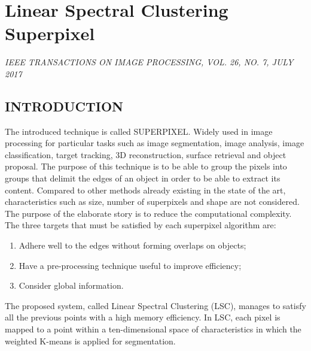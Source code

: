 \section{Linear Spectral Clustering Superpixel}

\begin{flushleft}
    \author{
    Jiansheng Chen, 
    \emph{Member, IEEE}, 
    Zhengqin Li,
    \emph{Student Member, IEEE}, 
    Bo Huang 
}
\end{flushleft}

\begin{center}
    \emph{IEEE TRANSACTIONS ON IMAGE PROCESSING, VOL. 26, NO. 7, JULY 2017}
\end{center}

\subsection{INTRODUCTION}
The introduced technique is called SUPERPIXEL. Widely used in image 
processing for particular tasks such as image segmentation, image analysis, 
image classification, target tracking, 3D reconstruction, surface retrieval and 
object proposal. The purpose of this technique is to be able to group the 
pixels into groups that delimit the edges of an object in order to be able 
to extract its content. Compared to other methods already existing in the 
state of the art, characteristics such as size, number of superpixels and shape 
are not considered. The purpose of the elaborate story is to reduce the 
computational complexity. The three targets that must be satisfied by each 
superpixel algorithm are:
\begin{enumerate}
    \item Adhere well to the edges without forming overlaps on objects;
    \item Have a pre-processing technique useful to improve efficiency;
    \item Consider global information.
\end{enumerate}
The proposed system, called Linear Spectral Clustering (LSC), manages to 
satisfy all the previous points with a high memory efficiency. In LSC, each 
pixel is mapped to a point within a ten-dimensional space of characteristics 
in which the weighted K-means is applied for segmentation. 

